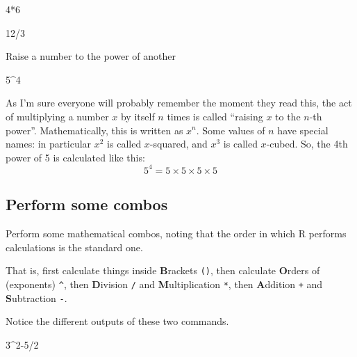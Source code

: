 \documentclass[
]{book}
\newenvironment{Shaded}{\begin{snugshade}}{\end{snugshade}}
\newcommand{\DecValTok}[1]{\textcolor[rgb]{0.00,0.00,0.81}{#1}}
\newcommand{\SpecialCharTok}[1]{\textcolor[rgb]{0.00,0.00,0.00}{#1}}
\begin{document}
\begin{Shaded}
\begin{Highlighting}[]
\DecValTok{4}\SpecialCharTok{*}\DecValTok{6}
\end{Highlighting}
\end{Shaded}

\begin{Shaded}
\begin{Highlighting}[]
\DecValTok{12}\SpecialCharTok{/}\DecValTok{3}
\end{Highlighting}
\end{Shaded}

Raise a number to the power of another

\begin{Shaded}
\begin{Highlighting}[]
\DecValTok{5}\SpecialCharTok{\^{}}\DecValTok{4}
\end{Highlighting}
\end{Shaded}

As I'm sure everyone will probably remember the moment they read this, the act of multiplying a number \(x\) by itself \(n\) times is called ``raising \(x\) to the \(n\)-th power''. Mathematically, this is written as \(x^n\). Some values of \(n\) have special names: in particular \(x^2\) is called \(x\)-squared, and \(x^3\) is called \(x\)-cubed. So, the 4th power of 5 is calculated like this:
\[
5^4 = 5 \times 5 \times 5 \times 5 
\]

\hypertarget{perform-some-combos}{%
\subsection{Perform some combos}\label{perform-some-combos}}

Perform some mathematical combos, noting that the order in which R performs calculations is the standard one.

That is, first calculate things inside \textbf{B}rackets \texttt{()}, then calculate \textbf{O}rders of (exponents) \texttt{\^{}}, then \textbf{D}ivision \texttt{/} and \textbf{M}ultiplication \texttt{*}, then \textbf{A}ddition \texttt{+} and \textbf{S}ubtraction \texttt{-}.

Notice the different outputs of these two commands.

\begin{Shaded}
\begin{Highlighting}[]
\DecValTok{3}\SpecialCharTok{\^{}}\DecValTok{2{-}5}\SpecialCharTok{/}\DecValTok{2}
\end{Highlighting}
\end{Shaded}
\end{document}
